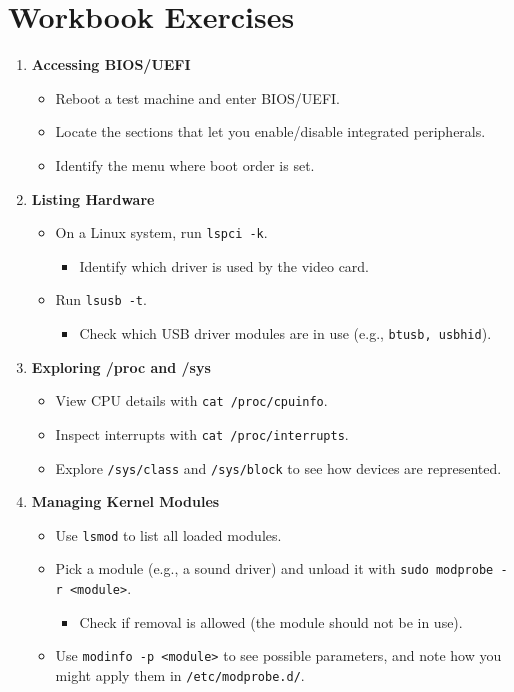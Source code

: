 \documentclass[a4paper]{report}
\begin{document}
\section*{Workbook Exercises}

\begin{enumerate}
    \item \textbf{Accessing BIOS/UEFI}
    \begin{itemize}
        \item Reboot a test machine and enter BIOS/UEFI.
        \item Locate the sections that let you enable/disable integrated peripherals.
        \item Identify the menu where boot order is set.
    \end{itemize}

    \item \textbf{Listing Hardware}
    \begin{itemize}
        \item On a Linux system, run \texttt{lspci -k}.
        \begin{itemize}
            \item Identify which driver is used by the video card.
        \end{itemize}
        \item Run \texttt{lsusb -t}.
        \begin{itemize}
            \item Check which USB driver modules are in use (e.g., \texttt{btusb, usbhid}).
        \end{itemize}
    \end{itemize}

    \item \textbf{Exploring /proc and /sys}
    \begin{itemize}
        \item View CPU details with \texttt{cat /proc/cpuinfo}.
        \item Inspect interrupts with \texttt{cat /proc/interrupts}.
        \item Explore \texttt{/sys/class} and \texttt{/sys/block} to see how devices are represented.
    \end{itemize}

    \item \textbf{Managing Kernel Modules}
    \begin{itemize}
        \item Use  \texttt{lsmod} to list all loaded modules.
        \item Pick a module (e.g., a sound driver) and unload it with \texttt{sudo modprobe -r <module>}.
        \begin{itemize}
            \item Check if removal is allowed (the module should not be in use).
        \end{itemize}
        \item Use \texttt{modinfo -p <module>} to see possible parameters, and note how you might apply them in \texttt{/etc/modprobe.d/}.
        

\end{itemize}
\end{enumerate}
\end{document}
